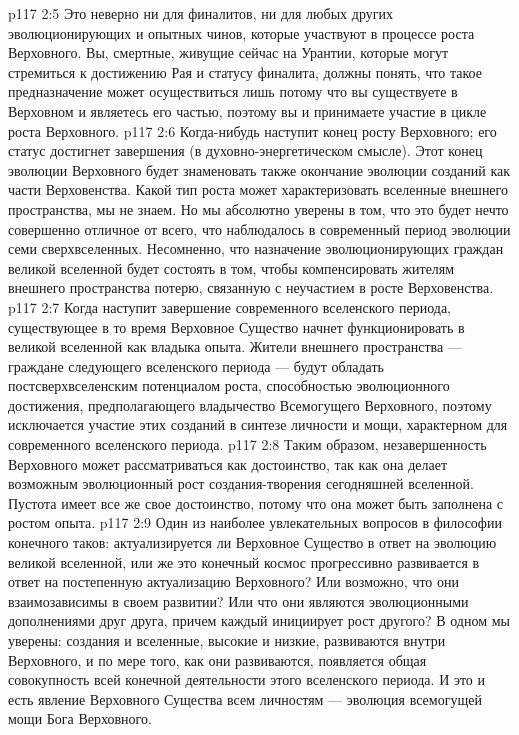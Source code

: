 \vs p117 2:5 Это неверно ни для финалитов, ни для любых других эволюционирующих и опытных чинов, которые участвуют в процессе роста Верховного. Вы, смертные, живущие сейчас на Урантии, которые могут стремиться к достижению Рая и статусу финалита, должны понять, что такое предназначение может осуществиться лишь потому что вы существуете в Верховном и являетесь его частью, поэтому вы и принимаете участие в цикле роста Верховного.
\vs p117 2:6 \pc Когда\hyp{}нибудь наступит конец росту Верховного; его статус достигнет завершения (в духовно\hyp{}энергетическом смысле). Этот конец эволюции Верховного будет знаменовать также окончание эволюции созданий как части Верховенства. Какой тип роста может характеризовать вселенные внешнего пространства, мы не знаем. Но мы абсолютно уверены в том, что это будет нечто совершенно отличное от всего, что наблюдалось в современный период эволюции семи сверхвселенных. Несомненно, что назначение эволюционирующих граждан великой вселенной будет состоять в том, чтобы компенсировать жителям внешнего пространства потерю, связанную с неучастием в росте Верховенства.
\vs p117 2:7 Когда наступит завершение современного вселенского периода, существующее в то время Верховное Существо начнет функционировать в великой вселенной как владыка опыта. Жители внешнего пространства --- граждане следующего вселенского периода --- будут обладать постсверхвселенским потенциалом роста, способностью эволюционного достижения, предполагающего владычество Всемогущего Верховного, поэтому исключается участие этих созданий в синтезе личности и мощи, характерном для современного вселенского периода.
\vs p117 2:8 Таким образом, незавершенность Верховного может рассматриваться как достоинство, так как она делает возможным эволюционный рост создания\hyp{}творения сегодняшней вселенной. Пустота имеет все же свое достоинство, потому что она может быть заполнена с ростом опыта.
\vs p117 2:9 \pc Один из наиболее увлекательных вопросов в философии конечного таков: актуализируется ли Верховное Существо в ответ на эволюцию великой вселенной, или же это конечный космос прогрессивно развивается в ответ на постепенную актуализацию Верховного? Или возможно, что они взаимозависимы в своем развитии? Или что они являются эволюционными дополнениями друг друга, причем каждый инициирует рост другого? В одном мы уверены: создания и вселенные, высокие и низкие, развиваются внутри Верховного, и по мере того, как они развиваются, появляется общая совокупность всей конечной деятельности этого вселенского периода. И это и есть явление Верховного Существа всем личностям --- эволюция всемогущей мощи Бога Верховного.
